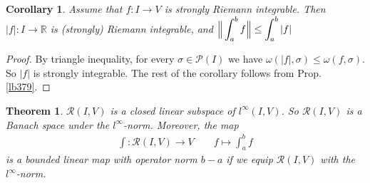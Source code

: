 \documentclass[12pt,b5paper,notitlepage]{article}
\theoremstyle{definition}
\theoremstyle{plain}
\newtheorem{thm}[df]{Theorem}
\newtheorem{co}[df]{Corollary}
\newcommand{\mc}{\mathcal}
\newcommand{\scr}{\mathscr}
\newcommand{\Rbb}{\mathbb R}
\newcommand{\dps}{\displaystyle}
\numberwithin{equation}{section}
\begin{document}
\begin{co}\label{lb417}
Assume that $f:I\rightarrow V$ is strongly Riemann integrable. Then $|f|:I\rightarrow\Rbb$ is (strongly) Riemann integrable, and $\dps\dps \Big\Vert \int_a^b f \Big\Vert\leq\int_a^b |f|$
\end{co}


\begin{proof}
By triangle inequality, for every $\sigma\in\mc P(I)$ we have $\omega(|f|,\sigma)\leq \omega(f,\sigma)$. So $|f|$ is strongly integrable. The rest of the corollary follows from Prop. \ref{lb379}.
\end{proof}




\begin{thm}\label{lb375}
$\scr R(I,V)$ is a closed linear subspace of $l^\infty(I,V)$. So $\scr R(I,V)$ is a Banach space under the $l^\infty$-norm. Moreover,  the map
\begin{align}
\int: \scr R(I,V)\rightarrow V\qquad f\mapsto\int_a^b f \label{eq159}
\end{align}
is a bounded linear map with operator norm $b-a$ if we equip $\scr R(I,V)$ with the $l^\infty$-norm.
\end{thm}

\end{document}
